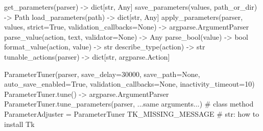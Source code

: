 \begin{pycode}
get_parameters(parser) -> dict[str, Any]
save_parameters(values, path_or_dir) -> Path
load_parameters(path) -> dict[str, Any]
apply_parameters(parser, values, strict=True,
                 validation_callbacks=None) -> argparse.ArgumentParser
parse_value(action, text, validator=None) -> Any
parse_bool(value) -> bool
format_value(action, value) -> str
describe_type(action) -> str
tunable_actions(parser) -> dict[str, argparse.Action]

ParameterTuner(parser, save_delay=30000, save_path=None, auto_save_enabled=True,
               validation_callbacks=None, inactivity_timeout=10)
ParameterTuner.tune() -> argparse.ArgumentParser
ParameterTuner.tune_parameters(parser, ...same arguments...)    # class method
ParameterAdjuster = ParameterTuner
TK_MISSING_MESSAGE                        # str: how to install Tk
\end{pycode}

\par\endgroup
